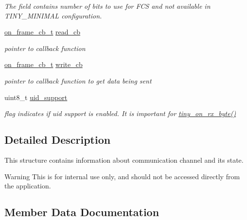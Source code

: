 \begin{DoxyCompactItemize}
\begin{DoxyCompactList}\small\item\em The field contains number of bits to use for F\+C\+S and not available in T\+I\+N\+Y\+\_\+\+M\+I\+N\+I\+M\+A\+L configuration. \end{DoxyCompactList}\item 
\hyperlink{tiny__layer2_8h_ad6bf709565b8aecb9e6ecf196f219d54}{on\+\_\+frame\+\_\+cb\+\_\+t} \hyperlink{structSTinyData_a31ba50154472c11e0d063b0aeef95f4d}{read\+\_\+cb}
\begin{DoxyCompactList}\small\item\em pointer to callback function \end{DoxyCompactList}\item 
\hyperlink{tiny__layer2_8h_ad6bf709565b8aecb9e6ecf196f219d54}{on\+\_\+frame\+\_\+cb\+\_\+t} \hyperlink{structSTinyData_ada334c88e86bfd2c10191f65818c3fb3}{write\+\_\+cb}
\begin{DoxyCompactList}\small\item\em pointer to callback function to get data being sent \end{DoxyCompactList}\item 
\hypertarget{structSTinyData_aa004bdc7db38cbbef4df4a4d94ca6a4b}{}uint8\+\_\+t \hyperlink{structSTinyData_aa004bdc7db38cbbef4df4a4d94ca6a4b}{uid\+\_\+support}\label{structSTinyData_aa004bdc7db38cbbef4df4a4d94ca6a4b}

\begin{DoxyCompactList}\small\item\em flag indicates if uid support is enabled. It is important for \hyperlink{group__ADVANCED__API_gaaf9bf6423bd0b8388c3387225b805278}{tiny\+\_\+on\+\_\+rx\+\_\+byte()} \end{DoxyCompactList}\end{DoxyCompactItemize}


\subsection{Detailed Description}
This structure contains information about communication channel and its state. \begin{DoxyWarning}{Warning}
This is for internal use only, and should not be accessed directly from the application. 
\end{DoxyWarning}


\subsection{Member Data Documentation}
\hypertarget{structSTinyData_a31ba50154472c11e0d063b0aeef95f4d}{}
